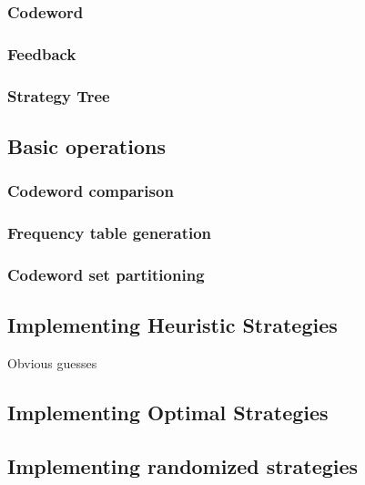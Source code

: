 \subsubsection{Codeword}

\subsubsection{Feedback}

\subsubsection{Strategy Tree}

\subsection{Basic operations}

\subsubsection{Codeword comparison}

\subsubsection{Frequency table generation}

\subsubsection{Codeword set partitioning}

\subsection{Implementing Heuristic Strategies}

 Obvious guesses
 
\subsection{Implementing Optimal Strategies}
 
\subsection{Implementing randomized strategies}
